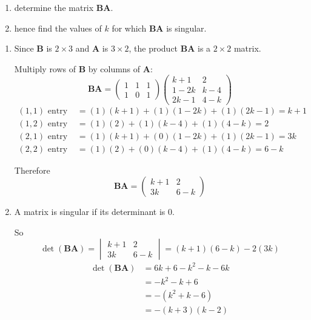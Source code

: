 \documentclass[leqno]{article}
\begin{document}
\begin{enumerate}[
  label=\textbf{\arabic*.},
  leftmargin=*,
  topsep=0pt,
  partopsep=0pt,
  parsep=0pt
]
\begin{enumerate}[label=\textbf{(\alph*)}]
  \item determine the matrix $\mathbf{BA}$.  \\
  \item hence find the values of $k$ for which $\mathbf{BA}$ is singular.  \\
\end{enumerate}

\vspace*{10pt}

\begin{djsSolution}
\begin{enumerate}[label=\textbf{(\alph*)}]
  \item Since $\mathbf{B}$ is $2\times 3$ and $\mathbf{A}$ is $3\times 2$, the product $\mathbf{BA}$ is a $2\times 2$ matrix.

  Multiply rows of $\mathbf{B}$ by columns of $\mathbf{A}$:
  \[
  \mathbf{BA}=
  \begin{pmatrix}
  1 & 1 & 1\\
  1 & 0 & 1
  \end{pmatrix}
  \begin{pmatrix}
  k+1 & 2\\
  1-2k & k-4\\
  2k-1 & 4-k
  \end{pmatrix}
  \]
  \begin{align*}
  (1,1)\text{  entry  }  &=(1)(k+1)+(1)(1-2k)+(1)(2k-1)=k+1 \\
  (1,2)\text{  entry  } &=(1)(2)+(1)(k-4)+(1)(4-k)=2 \\
  (2,1)\text{  entry  } &=(1)(k+1)+(0)(1-2k)+(1)(2k-1)=3k \\
  (2,2)\text{  entry  } &=(1)(2)+(0)(k-4)+(1)(4-k)=6-k
  \end{align*}

  Therefore
  \[
  \mathbf{BA}=\begin{pmatrix}k+1 & 2\\ 3k & 6-k\end{pmatrix}
  \]

  \item A matrix is singular if its determinant is $0$.

  So
  \[
  \det(\mathbf{BA})=
  \begin{vmatrix}
  k+1 & 2\\
  3k & 6-k
  \end{vmatrix}
  =(k+1)(6-k)-2(3k)
  \]
  \begin{align*}
  \det(\mathbf{BA})&=6k+6-k^2-k-6k \\
          &=-k^2-k+6 \\
          &=-(k^2+k-6) \\
          &=-(k+3)(k-2)
  \end{align*}


\end{enumerate}
\end{djsSolution}
\end{enumerate}
\end{document}
